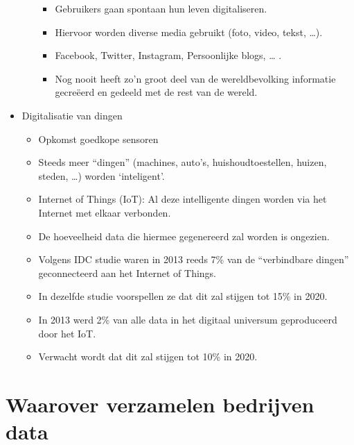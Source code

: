 \documentclass[]{memoir}
\providecommand{\tightlist}{%
  \setlength{\itemsep}{0pt}\setlength{\parskip}{0pt}}
\begin{document}
\begin{itemize}
\begin{itemize}
    \begin{itemize}
    \tightlist
    \item
      Gebruikers gaan spontaan hun leven digitaliseren.
    \item
      Hiervoor worden diverse media gebruikt (foto, video, tekst,
      \ldots{}).
    \item
      Facebook, Twitter, Instagram, Persoonlijke blogs, \ldots{} .
    \item
      Nog nooit heeft zo'n groot deel van de wereldbevolking informatie
      gecreëerd en gedeeld met de rest van de wereld.
    \end{itemize}
  \end{itemize}
\item
  Digitalisatie van dingen

  \begin{itemize}
  \tightlist
  \item
    Opkomst goedkope sensoren
  \item
    Steeds meer ``dingen'' (machines, auto's, huishoudtoestellen,
    huizen, steden, \ldots{}) worden `inteligent'.
  \item
    Internet of Things (IoT): Al deze intelligente dingen worden via het
    Internet met elkaar verbonden.
  \item
    De hoeveelheid data die hiermee gegenereerd zal worden is ongezien.
  \item
    Volgens IDC studie waren in 2013 reeds 7\% van de ``verbindbare
    dingen'' geconnecteerd aan het Internet of Things.
  \item
    In dezelfde studie voorspellen ze dat dit zal stijgen tot 15\% in
    2020.
  \item
    In 2013 werd 2\% van alle data in het digitaal universum
    geproduceerd door het IoT.
  \item
    Verwacht wordt dat dit zal stijgen tot 10\% in 2020.
  \end{itemize}
\end{itemize}

\section{Waarover verzamelen bedrijven
data}\label{waarover-verzamelen-bedrijven-data}
\end{document}
